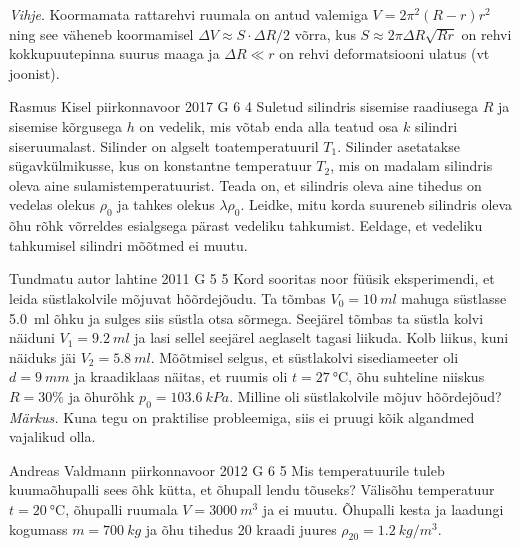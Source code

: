 \documentclass[11pt]{article}
\begin{document}
{{\textit{Vihje}. Koormamata rattarehvi ruumala on antud valemiga $V=2\pi^{2}\left(R-r\right)r^{2}$
ning see väheneb koormamisel $\Delta V\approx S\cdot\Delta R/2$ võrra,
kus $S\approx2\pi\Delta R\sqrt{Rr}$ on rehvi kokkupuutepinna suurus
maaga ja $\Delta R\ll r$ on rehvi deformatsiooni ulatus (vt joonist).
\fi
}

{Rasmus Kisel} %
{piirkonnavoor} %
{2017} %
{G 6} %
{4} %
{
\ifStatement
Suletud silindris sisemise raadiusega $R$ ja sisemise kõrgusega $h$ on vedelik, mis võtab enda alla teatud osa $k$ silindri siseruumalast. Silinder on algselt toatemperatuuril $T_{1}$. Silinder asetatakse sügavkülmikusse, kus on konstantne temperatuur $T_{2}$, mis on madalam silindris oleva aine sulamistemperatuurist. Teada on, et silindris oleva aine tihedus on vedelas olekus $\rho_0$ ja tahkes olekus $\lambda\rho_0$. Leidke, mitu korda suureneb silindris oleva õhu rõhk võrreldes esialgsega pärast vedeliku tahkumist. Eeldage, et vedeliku tahkumisel silindri mõõtmed ei muutu.
\fi
}

{Tundmatu autor} %
{lahtine} %
{2011} %
{G 5} %
{5} %
{
\ifStatement
Kord sooritas noor füüsik eksperimendi, et leida süstlakolvile mõjuvat
hõõrdejõudu. Ta tõmbas $V_{0}=\SI{10}{ml}$ mahuga süstlasse \SI{5,0}{ml} õhku ja sulges siis
süstla otsa sõrmega. Seejärel tõmbas ta süstla kolvi näiduni
$V_{1}=\SI{9,2}{ml}$ ja
lasi sellel seejärel aeglaselt tagasi liikuda. Kolb liikus, kuni näiduks jäi $V_{2}=\SI{5,8}{ml}$.
Mõõtmisel selgus, et süstlakolvi sisediameeter oli $d=\SI{9}{mm}$ ja kraadiklaas
näitas, et ruumis oli $t=\SI{27}{\celsius}$, õhu suhteline niiskus $R=30\%$ ja õhurõhk
$p_{0}=\SI{103,6}{kPa}$. Milline oli süstlakolvile mõjuv hõõrdejõud?\\
\textit{Märkus.} Kuna tegu on praktilise probleemiga, siis ei pruugi kõik
algandmed vajalikud olla.
\fi
}

{Andreas Valdmann} %
{piirkonnavoor} %
{2012} %
{G 6} %
{5} %
{
\ifStatement
Mis temperatuurile tuleb kuumaõhupalli sees õhk kütta, et õhupall lendu tõuseks?
Välisõhu temperatuur $t=\SI{20}{\celsius}$, õhupalli ruumala $V=\SI{3000}{m^3}$ ja ei
muutu. Õhupalli kesta ja laadungi kogumass $m=\SI{700}{kg}$ ja õhu tihedus
20 kraadi juures $\rho_{20}=\SI{1,2}{kg/m^3}$.
\fi
}

}
\end{document}
